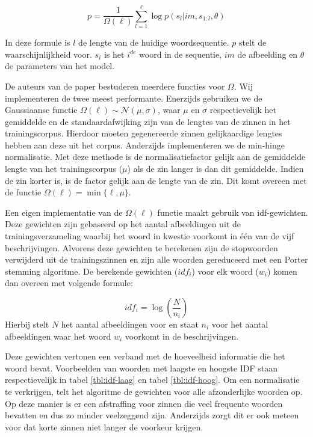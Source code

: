 \begin{equation}
p = \frac{1}{\Omega(\ell)}\sum_{l=1}^{\ell} \log p(s_l | im, s_{1:l}, \theta)
\label{eq:log-sentence-norm}
\end{equation}

In deze formule is $l$ de lengte van de huidige woordsequentie. $p$ stelt de waarschijnlijkheid voor. $s_i$ is het $i^{de}$ woord in de sequentie, $im$ de afbeelding en $\theta$ de parameters van het model. 

De auteurs van de paper bestuderen meerdere functies voor $\Omega$. Wij implementeren de twee meest performante.
Enerzijds gebruiken we de Gaussiaanse functie $\Omega(\ell) \sim \mathcal{N}(\mu, \sigma)$, waar $\mu$ en $\sigma$ respectievelijk het gemiddelde en de standaardafwijking zijn van de lengtes van de zinnen in het trainingscorpus. Hierdoor moeten gegenereerde zinnen gelijkaardige lengtes hebben aan deze uit het corpus. 
Anderzijds implementeren we de min-hinge normalisatie. Met deze methode is de normalisatiefactor gelijk aan de gemiddelde lengte van het trainingscorpus ($\mu$) als de zin langer is dan dit gemiddelde. Indien de zin korter is, is de factor gelijk aan de lengte van de zin. Dit komt overeen met de functie $\Omega(\ell)=\min\{\ell, \mu\}$.

Een eigen implementatie van de $\Omega(\ell)$ functie maakt gebruik van idf-gewichten. Deze gewichten zijn gebaseerd op het aantal afbeeldingen uit de trainingsverzameling waarbij het woord in kwestie voorkomt in \'e\'en van de vijf beschrijvingen. Alvorens deze gewichten te berekenen zijn de stopwoorden verwijderd uit de trainingszinnen en zijn alle woorden gereduceerd met een Porter stemming algoritme. De berekende gewichten ($idf_i$) voor elk woord ($w_i$) komen dan overeen met volgende formule: 

\begin{equation}
    idf_i = \log(\frac{N}{n_i})
\end{equation}
Hierbij stelt $N$ het aantal afbeeldingen voor en staat $n_i$ voor het aantal afbeeldingen waar het woord $w_i$ voorkomt in de beschrijvingen.

Deze gewichten vertonen een verband met de hoeveelheid informatie die het woord bevat. Voorbeelden van woorden met laagste en hoogste IDF staan respectievelijk in tabel \ref{tbl:idf-laag} en tabel \ref{tbl:idf-hoog}. Om een normalisatie te verkrijgen, telt het algoritme de gewichten voor alle afzonderlijke woorden op. Op deze manier is er een afstraffing voor zinnen die veel frequente woorden bevatten en dus zo minder veelzeggend zijn. Anderzijds zorgt dit er ook meteen voor dat korte zinnen niet langer de voorkeur krijgen.

